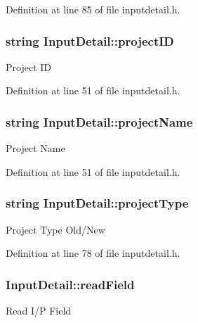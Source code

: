 Definition at line 85 of file inputdetail.\-h.

\hypertarget{classInputDetail_a08069ee622c626c038b821ddcc7427b4}{
\subsubsection[{project\-I\-D}]{\setlength{\rightskip}{0pt plus 5cm}string Input\-Detail\-::project\-I\-D\hspace{0.3cm}{\ttfamily [protected]}}}\label{classInputDetail_a08069ee622c626c038b821ddcc7427b4}
Project I\-D 

Definition at line 51 of file inputdetail.\-h.

\hypertarget{classInputDetail_aaaf51475a2a4ddbe34e38c96bdb45bad}{
\subsubsection[{project\-Name}]{\setlength{\rightskip}{0pt plus 5cm}string Input\-Detail\-::project\-Name\hspace{0.3cm}{\ttfamily [protected]}}}\label{classInputDetail_aaaf51475a2a4ddbe34e38c96bdb45bad}
Project Name 

Definition at line 51 of file inputdetail.\-h.

\hypertarget{classInputDetail_ad2c46fdc8093eb88e01497e55b2e8e4d}{
\subsubsection[{project\-Type}]{\setlength{\rightskip}{0pt plus 5cm}string Input\-Detail\-::project\-Type\hspace{0.3cm}{\ttfamily [protected]}}}\label{classInputDetail_ad2c46fdc8093eb88e01497e55b2e8e4d}
Project Type Old/\-New 

Definition at line 78 of file inputdetail.\-h.

\hypertarget{classInputDetail_ac0cc70b017ef94fb55acb46fc44f0df5}{
\subsubsection[{read\-Field}]{ Input\-Detail\-::read\-Field}}\label{classInputDetail_ac0cc70b017ef94fb55acb46fc44f0df5}
Read I/\-P Field 

